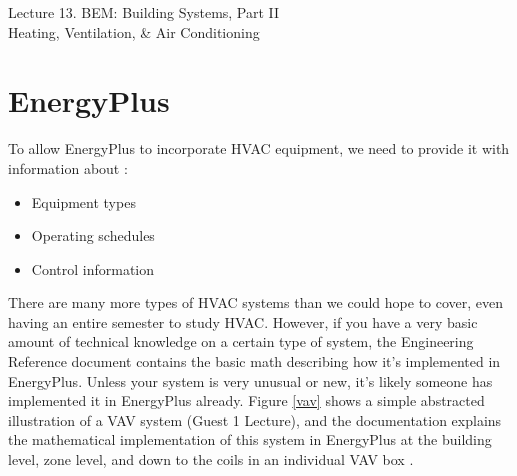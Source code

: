 \documentclass[10pt]{article}
\begin{document}
   \noindent
   \begin{center}

   \hrulefill
   
   \vspace{5pt}
   
   \vspace{0pt}
   
   {\Large \hfill  Lecture 13. BEM: Building Systems, Part II\\ \hfill {\large Heating, Ventilation, \& Air Conditioning}}
   \vspace{5pt}
   
  
   \hrulefill
   \end{center}

{}


\section{EnergyPlus}

To allow EnergyPlus to incorporate HVAC equipment, we need to provide it with information about \cite{EPcourseteaching}:

\vspace{-6pt}
\begin{itemize}
    \setlength{\itemsep}{0pt}%
    \setlength{\parskip}{0pt}%
    \item Equipment types
    \item Operating schedules
    \item Control information
\end{itemize}
\vspace{-6pt}

There are many more types of HVAC systems than we could hope to cover, even having an entire semester to study HVAC. However, if you have a very basic amount of technical knowledge on a certain type of system, the Engineering Reference document \cite{EPdocs9engineering} contains the basic math describing how it's implemented in EnergyPlus. Unless your system is very unusual or new, it's likely someone has implemented it in EnergyPlus already. Figure \ref{vav} shows a simple abstracted illustration of a VAV system (Guest 1 Lecture), and the documentation explains the mathematical implementation of this system in EnergyPlus at the building level, zone level, and down to the coils in an individual VAV box \cite{EPdocs9engineering}. 
\end{document}
